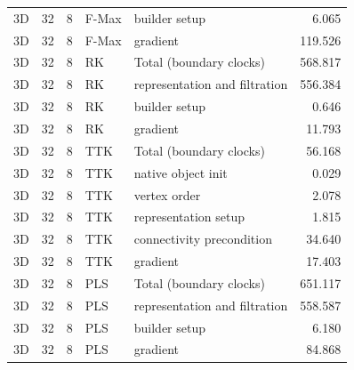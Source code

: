 \begin{tabular}{lrrllr}
3D & 32 & 8 & F-Max & builder setup & 6.065 \\
3D & 32 & 8 & F-Max & gradient & 119.526 \\
3D & 32 & 8 & RK & Total (boundary clocks) & 568.817 \\
3D & 32 & 8 & RK & representation and filtration & 556.384 \\
3D & 32 & 8 & RK & builder setup & 0.646 \\
3D & 32 & 8 & RK & gradient & 11.793 \\
3D & 32 & 8 & TTK & Total (boundary clocks) & 56.168 \\
3D & 32 & 8 & TTK & native object init & 0.029 \\
3D & 32 & 8 & TTK & vertex order & 2.078 \\
3D & 32 & 8 & TTK & representation setup & 1.815 \\
3D & 32 & 8 & TTK & connectivity precondition & 34.640 \\
3D & 32 & 8 & TTK & gradient & 17.403 \\
3D & 32 & 8 & PLS & Total (boundary clocks) & 651.117 \\
3D & 32 & 8 & PLS & representation and filtration & 558.587 \\
3D & 32 & 8 & PLS & builder setup & 6.180 \\
3D & 32 & 8 & PLS & gradient & 84.868 \\
\hline
\end{tabular}

